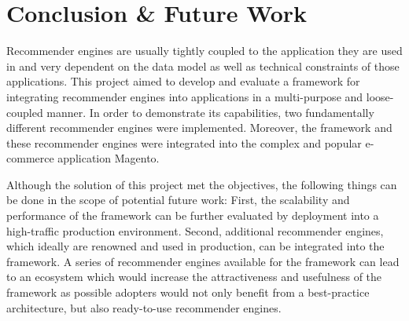 \chapter{Conclusion \& Future Work}

Recommender engines are usually tightly coupled to the application they are used in and very dependent on the data model as well as technical constraints of those applications. This project aimed to develop and evaluate a framework for integrating recommender engines into applications in a multi-purpose and loose-coupled manner. In order to demonstrate its capabilities, two fundamentally different recommender engines were implemented. Moreover, the framework and these recommender engines were integrated into the complex and popular e-commerce application Magento.

Although the solution of this project met the objectives, the following things can be done in the scope of potential future work: First, the scalability and performance of the framework can be  further evaluated by deployment into a high-traffic production environment. Second, additional recommender engines, which ideally are renowned and used in production, can be integrated into the framework. A series of recommender engines available for the framework can lead to an ecosystem which would increase the attractiveness and usefulness of the framework as possible adopters would not only benefit from a best-practice architecture, but also ready-to-use recommender engines.